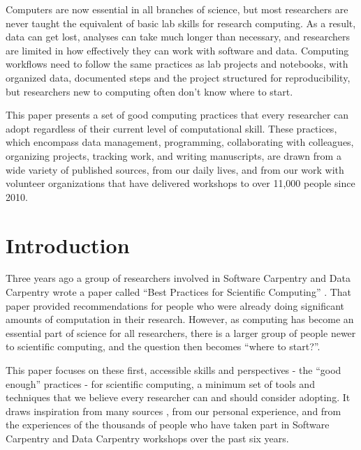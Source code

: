 \documentclass[10pt,letterpaper]{article}
\newcommand{\withurl}[2]{{#1}}
\begin{document}
Computers are now essential in all branches of science, but most
researchers are never taught the equivalent of basic lab skills for
research computing. As a result, data can get lost, analyses can take
much longer than necessary, and researchers are limited in how
effectively they can work with software and data. Computing
workflows need to follow the same practices as lab projects and
notebooks, with organized data, documented steps and the project
structured for reproducibility, but researchers new to computing often
don't know where to start.

This paper presents a set of good computing practices that every
researcher can adopt regardless of their current level of
computational skill.  These practices, which encompass data
management, programming, collaborating with colleagues, organizing
projects, tracking work, and writing manuscripts, are drawn from a
wide variety of published sources, from our daily lives, and from our
work with volunteer organizations that have delivered workshops to
over 11,000 people since 2010.

\linenumbers

\section*{Introduction}\label{sec:introduction}

Three years ago a group of researchers involved in \withurl{Software
  Carpentry}{http://software-carpentry.org/} and \withurl{Data
  Carpentry}{http://datacarpentry.org/} wrote a paper called ``Best
Practices for Scientific Computing'' \cite{wilson2014}.  That paper
provided recommendations for people who were already doing significant
amounts of computation in their research.  However, as computing has
become an essential part of science for all researchers, there is a
larger group of people newer to scientific computing, and the question
then becomes ``where to start?''.

This paper focuses on these first, accessible skills and perspectives
- the ``good enough'' practices - for scientific computing, a minimum
set of tools and techniques that we believe every researcher can and
should consider adopting. It draws inspiration from many sources
\cite{gentzkow2014,noble2009,brown2015,wickham2014,kitzes2016,sandve2013,hart2016},
from our personal experience, and from the experiences of the
thousands of people who have taken part in Software Carpentry and Data
Carpentry workshops over the past six years.
\end{document}
